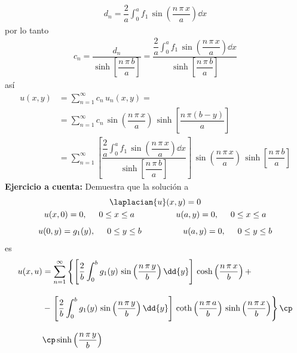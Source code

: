 \begin{align*}
d_{n} = \dfrac{2}{a} \int_{0}^{a} f_{1} \, \sin  \left( \dfrac{n \, \pi \, x}{a} \right) \dd{x}
\end{align*}
por lo tanto
\begin{align*}
c_{n} = \dfrac{d_{n}}{\sinh \left[ \dfrac{n \, \pi \, b}{a} \right]} = \dfrac{\displaystyle \dfrac{2}{a} \int_{0}^{a} f_{1} \, \sin  \left( \dfrac{n \, \pi \, x}{a} \right) \dd{x}}{\sinh \left[ \dfrac{n \, \pi \, b}{a} \right]}
\end{align*}
así
\begin{align*}
u(x,y) &= \sum_{n=1}^{\infty} c_{n} \, u_{n} (x, y) = \\[0.5em]
&= \sum_{n=1}^{\infty} c_{n} \, \sin \left( \dfrac{n \, \pi \, x}{a} \right) \, \sinh \left[ \dfrac{n \, \pi (b - y)}{a} \right] \\[0.5em]
&= \sum_{n=1}^{\infty} \left[ \dfrac{\displaystyle \dfrac{2}{a} \int_{0}^{a} f_{1} \, \sin  \left( \dfrac{n \, \pi \, x}{a} \right) \dd{x}}{\sinh \left[ \dfrac{n \, \pi \, b}{a} \right]} \right] \, \sin \left( \dfrac{n \, \pi \, x}{a} \right) \, \sinh \left[ \dfrac{n \, \pi \, b}{a} \right]
\end{align*}
\textbf{Ejercicio a cuenta: } Demuestra que la solución a
\begin{align*}
\begin{gathered}
\laplacian{u}(x, y) = 0 \\
u(x, 0) = 0, \hspace{0.5cm} 0 \leq x \leq a \hspace{1.75cm} u(a, y) = 0, \hspace{0.5cm} 0 \leq x \leq a \\[0.5em]
u(0, y) = g_{1} (y), \hspace{0.5cm} 0 \leq y \leq b \hspace{1.75cm} u(a, y) = 0, \hspace{0.5cm} 0 \leq y \leq b
\end{gathered}
\end{align*}
es
\begin{align*}
u (x, u) &= \sum_{n=1}^{\infty} \left\{ \left[ \dfrac{2}{b} \int_{0}^{b} g_{1} (y) \, \sin \left( \dfrac{n \, \pi \, y}{b} \right) \dd{y} \right] \, \cosh \left( \dfrac{n \, \pi \, x}{b} \right) + \right. \\[1em]
&- \left. \left[ \dfrac{2}{b} \int_{0}^{b} g_{1} (y) \, \sin \left( \dfrac{n \, \pi \, y}{b} \right) \dd{y} \right] \, \coth \left( \dfrac{n \, \pi \, a}{b} \right) \, \sinh \left( \dfrac{n \, \pi \, x}{b} \right) \right\} \cp \\[1em]
&\cp \sinh \left( \dfrac{n \, \pi \, y}{b} \right)
\end{align*}
